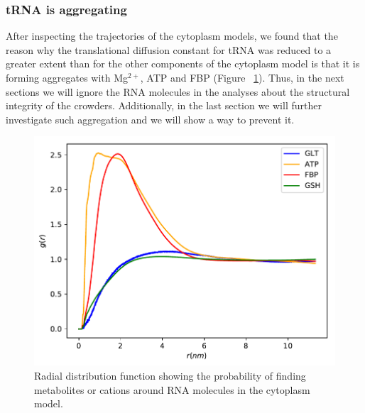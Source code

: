 \documentclass[journal=jacsat,manuscript=article]{achemso}
\begin{document}

\subsubsection{tRNA is aggregating}
After inspecting the trajectories of the cytoplasm models, we found that the reason why the translational diffusion constant for tRNA was reduced to a greater extent than for the other components of the cytoplasm model is that it is forming aggregates with Mg$^{2+}$, ATP and FBP (Figure ~\ref{fig:tRNA_aggregation}). Thus, in the next sections we will ignore the RNA molecules in the analyses about the structural integrity of the crowders. Additionally, in the last section we will further investigate such aggregation and we will show a way to prevent it.

\begin{figure}[H]
\includegraphics[scale=0.5]{rdf_RNA_metabolites.pdf}
\caption{Radial distribution function showing the probability of finding metabolites or cations around RNA molecules in the cytoplasm model.}
\label{fig:tRNA_aggregation}
\end{figure}



\end{document}
